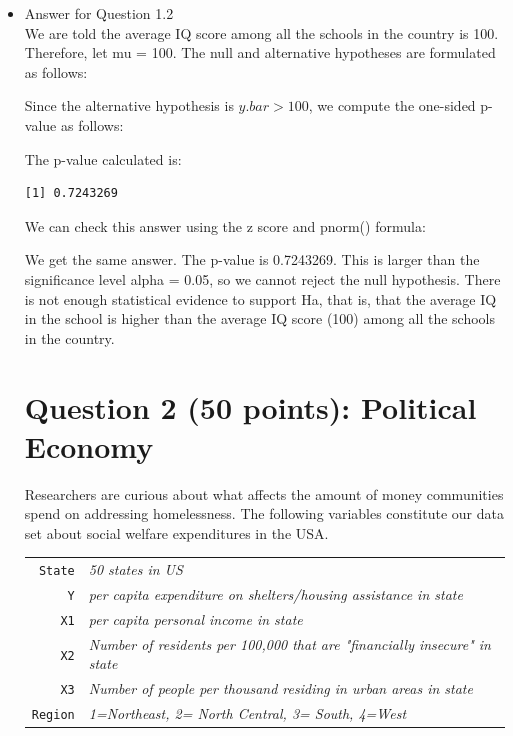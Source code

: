 \documentclass[12pt,letterpaper]{article}
\begin{document}
\begin{itemize}	
\item
Answer for Question 1.2\\
\noindent We  are told the average IQ score among all the schools in the country is 100. Therefore, let mu = 100. 
\noindent The null and alternative hypotheses are formulated as follows:
\vspace{.5cm}
  
\vspace{.5cm}
\noindent Since the alternative hypothesis is $y.bar > 100$, we compute the one-sided p-value as follows:
\vspace{.5cm}
  
\vspace{.5cm}
\noindent The p-value calculated is:
\begin{verbatim}
[1] 0.7243269
\end{verbatim}
\vspace{.3cm}
\noindent We can check this answer using the z score and pnorm() formula:
\vspace{.5cm}
  
\vspace{.5cm}
\noindent We get the same answer. The p-value is 0.7243269. This is larger than the significance level alpha = 0.05, so we cannot reject the null hypothesis. There is not enough statistical evidence to support Ha, that is, that the average IQ in the school is higher than the average IQ score (100) among all the schools in the country.

\newpage

	\section*{Question 2 (50 points): Political Economy}

\noindent Researchers are curious about what affects the amount of money communities spend on addressing homelessness. The following variables constitute our data set about social welfare expenditures in the USA. \\
\vspace{.5cm}


\begin{tabular}{r|l}
	\texttt{State} &\emph{50 states in US} \\
	\texttt{Y} & \emph{per capita expenditure on shelters/housing assistance in state}\\
	\texttt{X1} &\emph{per capita personal income in state} \\
	\texttt{X2} &  \emph{Number of residents per 100,000 that are "financially insecure" in state}\\
	\texttt{X3} &  \emph{Number of people per thousand residing in urban areas in state} \\
	\texttt{Region} &  \emph{1=Northeast, 2= North Central, 3= South, 4=West} \\
\end{tabular}


\end{itemize}
\end{document}
